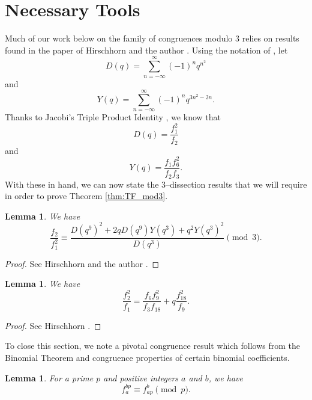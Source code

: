 \documentclass[10pt,a4paper]{amsart}
\newtheorem{lemma}[theorem]{Lemma}
\theoremstyle{definition}
\theoremstyle{example}
\begin{document}
\setcounter{section}{1}
\setcounter{equation}{2}
\setcounter{theorem}{3}
\section{Necessary Tools}
\label{sec:tools}

Much of our work below on the family of congruences modulo 3 relies on results found in the paper of Hirschhorn and the author \cite{HS2005}.  Using the notation of \cite{HS2005}, let 
$$D(q) = \sum_{n=-\infty}^\infty (-1)^nq^{n^2}$$ 
and 
$$Y(q) = \sum_{n=-\infty}^\infty (-1)^nq^{3n^2-2n}.$$ 
Thanks to Jacobi's Triple Product Identity \cite[(1.1.1)]{Hir}, we know that 
\begin{equation}
\label{D_prod}
D(q) = \frac{f_1^2}{f_2} 
\end{equation}
and 
\begin{equation}
\label{Y_prod}
Y(q) = \frac{f_1f_6^2}{f_2f_3}.
\end{equation}
With these in hand, we can now state the 3--dissection results that we will require in order to prove Theorem \ref{thm:TF_mod3}.  

\begin{lemma}
\label{lem:f2overf1squared_3diss} 
We have 
$$
\frac{f_2}{f_1^2} \equiv  \frac{D(q^9)^2 +2qD(q^9)Y(q^3)+q^2Y(q^3)^2}{D(q^3)} \pmod{3}.
$$
\end{lemma}
\begin{proof}
See Hirschhorn and the author \cite{HS2005}.  
\end{proof}

\begin{lemma}
\label{lem:psi_3diss}
We have 
$$
\frac{f_2^2}{f_1} = \frac{f_6f_9^2}{f_3f_{18}} +q\frac{f_{18}^2}{f_9}.  
$$
\end{lemma}
\begin{proof}
See Hirschhorn \cite[(14.3.3)]{Hir}.
\end{proof}



To close this section, we note a pivotal congruence result which follows from the Binomial Theorem and congruence properties of certain binomial coefficients.  
\begin{lemma} 
\label{lem:FD} 
For a prime $p$ and positive integers $a$ and $b$, we have 
$$
f_a^{bp} \equiv f_{ap}^b \pmod{p}.  
$$
\end{lemma}  
\end{document}
